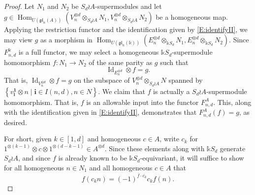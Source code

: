\documentclass[11pt,reqno]{amsart} %
\newcommand{\gl}{\mathfrak{gl}}
\renewcommand{\k}{\mathds{k}}
\newcommand{\0}{\bar{0}}
\newcommand{\1}{\bar{1}}
\newcommand{\parity}[1]{\overline{#1}}
\newcommand{\Id}{\operatorname{Id}}
\newcommand{\wreath}{\wr}
\newcommand{\SdwreathA}{S_{d} \wreath A}
\newcommand{\Hom}{\operatorname{Hom}}
\newcommand{\bi}{\mathbf{i}}
\newcommand{\bone}{\mathbf{1}}
\numberwithin{equation}{subsection}
\begin{document}
\begin{proof} Let $N_{1}$ and $N_{2}$ be $\SdwreathA$-supermodules and let $g \in \Hom_{U(\gl_{n}(A))}\left( V_{n}^{\otimes d} \otimes_{\SdwreathA} N_{1}, V_{n}^{\otimes d} \otimes_{\SdwreathA} N_{2}\right)$ be a homogeneous map.  Applying the restriction functor and the identification given by \eqref{E:identifyII}, we may view $g$ as a morphism in $\Hom_{U(\gl_{n}(\k))}\left( E_{n}^{\otimes d} \otimes_{\k S_{d}} N_{1}, E_{n}^{\otimes d} \otimes_{\k S_{d}} N_{2}\right)$.  Since $F_{n,d}^{\k}$ is a full functor, we may select a homogeneous $\k S_{d}$-supermodule homomorphism $f: N_{1} \to N_{2}$ of the same parity as $g$ such that 
\[
\Id_{E_{n}^{\otimes d}} \otimes f = g.
\]  That is, $\Id_{V_{n}^{\otimes d}} \otimes f = g$ on the subspace of $V_{n}^{\otimes d} \otimes_{\SdwreathA} N$ spanned by $\left\{v_{\bi}^{\bone} \otimes n \mid \bi \in I(n,d), n \in N \right\}$.  We claim that $f$ is actually a $\SdwreathA$-supermodule homomorphism.  That is, $f$ is an allowable input into the functor $F_{n,d}^{A}$. This, along with the identification given in \eqref{E:identifyII}, demonstrates that $F_{n,d}^{A}(f) = g$, as desired.


For short, given $k \in [1, d]$ and homogeneous $c \in A$, write $c_{k}$ for $1^{\otimes (k-1)} \otimes c \otimes 1^{\otimes (d-k-1)}  \in A^{\otimes d}$.  Since these elements along with $\k S_{d}$ generate $\SdwreathA$, and since $f$ is already known to be $\k S_{d}$-equivariant, it will suffice to show for all homogeneous $n \in N_{1}$ and all homogeneous $c \in A$  that 
\[
f \left( c_{k}n \right) = (-1)^{\parity{f}\cdot \parity{c_{k}}} c_{k}  f(n).
\] 


\end{proof}
\end{document}
